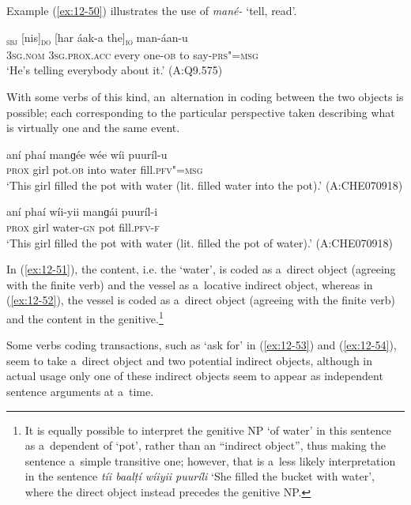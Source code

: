 Example (\ref{ex:12-50}) illustrates the use of \textit{mané-} `tell, read'.

\begin{exe}
\ex
\label{ex:12-50}
\gll [so]\textsubscript{\textsc{sbj}} [nis]\textsubscript{\textsc{do}} [har áak-a the]\textsubscript{\textsc{io}} man-áan-u \\
\textsc{3sg.nom} \textsc{3sg.prox.acc} every one-\textsc{ob} to say-\textsc{prs"=msg} \\
\glt `He's telling everybody about it.' (A:Q9.575)
\end{exe}

With some verbs of this kind, an~alternation in coding between the two objects is possible; each corresponding to the particular perspective taken describing what is virtually one and the same event. 

\begin{exe}
\ex
\label{ex:12-51}
\gll aní phaí manɡée wée wíi puuríl-u \\
\textsc{prox} girl pot.\textsc{ob} into water fill.\textsc{pfv"=msg} \\
\glt `This girl filled the pot with water (lit. filled water into the pot).' (A:CHE070918)
\end{exe}
\begin{exe}
\ex
\label{ex:12-52}
\gll aní phaí wíi-yii manɡái puuríl-i \\
\textsc{prox} girl water-\textsc{gn} pot fill.\textsc{pfv-f} \\
\glt `This girl filled the pot with water (lit. filled the pot of water).' (A:CHE070918)
\end{exe}

In (\ref{ex:12-51}), the content, i.e. the `water', is coded as a~direct object (agreeing with the finite verb) and the vessel as a~locative indirect object, whereas in (\ref{ex:12-52}), the vessel is coded as a~direct object (agreeing with the finite verb) and the content in the genitive.\footnote{It is equally possible to interpret the genitive NP `of water' in this sentence as a~dependent of `pot', rather than an ``indirect object'', thus making the sentence a~simple transitive one; however, that is a~less likely interpretation in the sentence \textit{tíi baalṭí wíiyii puuríli} `She filled the bucket with water', where the direct object instead precedes the genitive NP.} 


Some verbs coding transactions, such as `ask for' in (\ref{ex:12-53}) and (\ref{ex:12-54}), seem to take a~direct object and two potential indirect objects, although in actual usage only one of these indirect objects seem to appear as independent sentence arguments at a~time. 

